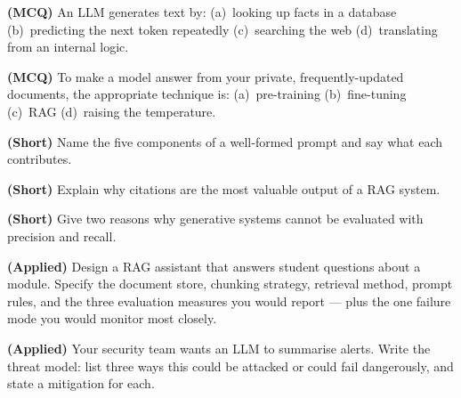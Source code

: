 \begin{reviewq}
  \item \textbf{(MCQ)} An LLM generates text by: (a)~looking up facts in a database
        (b)~predicting the next token repeatedly (c)~searching the web
        (d)~translating from an internal logic.
  \item \textbf{(MCQ)} To make a model answer from your private, frequently-updated
        documents, the appropriate technique is: (a)~pre-training (b)~fine-tuning
        (c)~RAG (d)~raising the temperature.
  \item \textbf{(Short)} Name the five components of a well-formed prompt and say
        what each contributes.
  \item \textbf{(Short)} Explain why citations are the most valuable output of a RAG
        system.
  \item \textbf{(Short)} Give two reasons why generative systems cannot be evaluated
        with precision and recall.
  \item \textbf{(Applied)} Design a RAG assistant that answers student questions
        about a module. Specify the document store, chunking strategy, retrieval
        method, prompt rules, and the three evaluation measures you would report ---
        plus the one failure mode you would monitor most closely.
  \item \textbf{(Applied)} Your security team wants an LLM to summarise alerts. Write
        the threat model: list three ways this could be attacked or could fail
        dangerously, and state a mitigation for each.
\end{reviewq}
